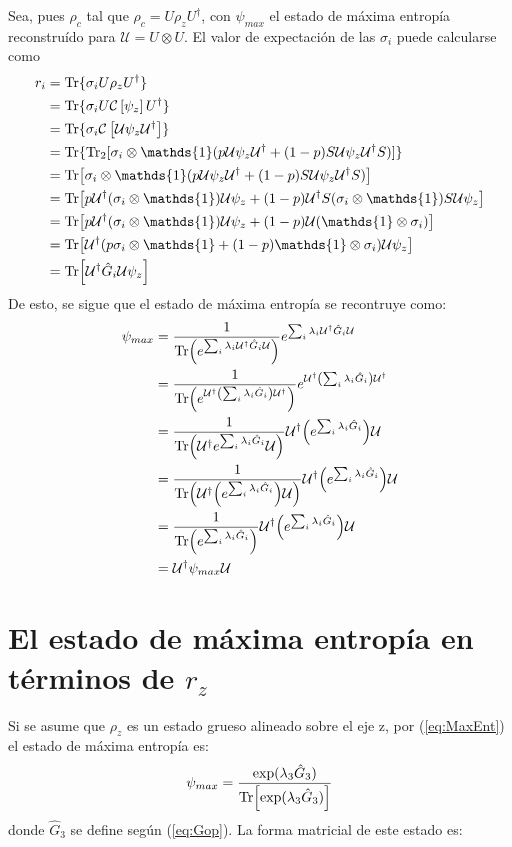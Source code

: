 \documentclass[onecolumn,11pt]{article}
\newcommand{\mcU}{\mathcal{U}}
\newcommand{\mcC}{\mathcal{C}}
\newcommand{\Id}{\mathds{1}}%
\newcommand{\CG}[1]{\mcC\left[#1\right]}
\begin{document}
Sea, pues $\rho_{c}$ tal que $\rho_{c}=U\rho_{z}U^{\dag}$, con $\psi_{max}$ el estado de máxima entropía reconstruído para  $\mcU=U\otimes U$. El valor de expectación de las $\sigma_{i}$ puede calcularse como
\begin{align*}
r_{i}&=\Tr\{\sigma_{i}U\rho_{z}U^{\dag}\}\\
&=\Tr\{\sigma_{i}U\CG{\psi_{z}}U^{\dag}\}\\
&=\Tr\{\sigma_{i}\CG{\mcU\psi_{z}\mcU^{\dag}}\}\\
&=\Tr\{\Tr_{2}[\sigma_{i}\otimes\Id(p\mcU\psi_{z}\mcU^{\dag}+(1-p)S\mcU\psi_{z}\mcU^{\dag}S)]\}\\
&=\Tr[\sigma_{i}\otimes\Id(p\mcU\psi_{z}\mcU^{\dag}+(1-p)S\mcU\psi_{z}\mcU^{\dag}S)]\\
&=\Tr[p\mcU^{\dag}(\sigma_{i}\otimes\Id)\mcU\psi_{z}+(1-p)\mcU^{\dag}S(\sigma_{i}\otimes\Id) S\mcU\psi_{z}]\\
&=\Tr[p\mcU^{\dag}(\sigma_{i}\otimes\Id)\mcU\psi_{z}+(1-p)\mcU(\Id\otimes\sigma_{i})]\\
&=\Tr[\mcU^{\dag}(p\sigma_{i}\otimes\Id+(1-p)\Id\otimes\sigma_{i})\mcU\psi_{z}]\\
&=\Tr[\mcU^{\dag}\hat{G}_{i}\mcU\psi_{z}]\\
\end{align*}
De esto, se sigue que el estado de máxima entropía se recontruye como:
\begin{align*}
\psi_{max}&=\frac{1}{\Tr(e^{\sum_{i}\lambda_{i}\mcU^{\dag}\hat{G}_{i}\mcU})}e^{\sum_{i}\lambda_{i}\mcU^{\dag}\hat{G}_{i}\mcU}\\
&=\frac{1}{\Tr(e^{\mcU^{\dag}\qty(\sum_{i}\lambda_{i}\hat{G}_{i})\mcU^{\dag}})}e^{\mcU^{\dag}\qty(\sum_{i}\lambda_{i}\hat{G}_{i})\mcU^{\dag}}\\
&=\frac{1}{\Tr(\mcU^{\dag}e^{\sum_{i}\lambda_{i}\hat{G}_{i}}\mcU)}\mcU^{\dag}\qty(e^{\sum_{i}\lambda_{i}\hat{G}_{i}})\mcU\\
&=\frac{1}{\Tr(\mcU^{\dag}\qty(e^{\sum_{i}\lambda_{i}\hat{G}_{i}})\mcU)}\mcU^{\dag}\qty(e^{\sum_{i}\lambda_{i}\hat{G}_{i}})\mcU\\
&=\frac{1}{\Tr(e^{\sum_{i}\lambda_{i}\hat{G}_{i}})}\mcU^{\dag}\qty(e^{\sum_{i}\lambda_{i}\hat{G}_{i}})\mcU\\
&=\mcU^{\dag}\psi_{max}\mcU
\end{align*}
\section{El estado de máxima entropía en términos de $r_{z}$}
Si se asume que $\rho_{z}$ es un estado grueso alineado sobre el eje z, por (\ref{eq:MaxEnt}) el estado de máxima entropía es:
\begin{equation}\label{eq:MaxEntZ}
\psi_{max}=\frac{\text{exp}(\lambda_{3}\hat{G}_{3})}{\Tr[\text{exp}(\lambda_{3}\hat{G}_{3})]}
\end{equation}
donde $\hat{G}_{3}$ se define según (\ref{eq:Gop}). La forma matricial de este estado es:



\end{document}
